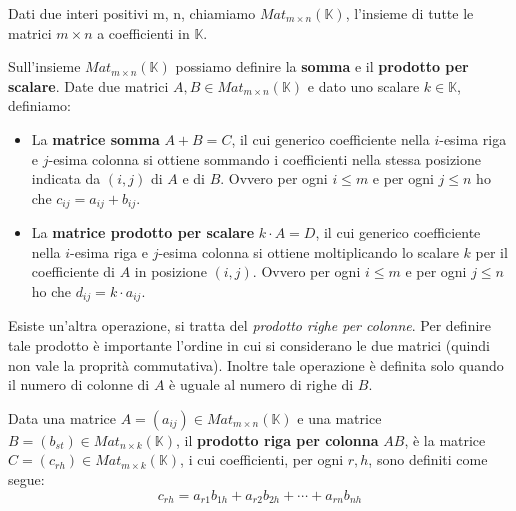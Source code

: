 \begin{definition}
	Dati due interi positivi m, n, chiamiamo
	$Mat_{m \times n} (\mathbb{K})$, l'insieme di tutte le matrici
	$m \times n$ a coefficienti in $\mathbb{K}$.
\end{definition}

\begin{definition}
	Sull'insieme $Mat_{m \times n} (\mathbb{K})$ possiamo definire la
	\textbf{somma} e il \textbf{prodotto per scalare}. Date due matrici
	$A, B \in Mat_{m \times n} (\mathbb{K})$ e dato uno scalare
	$k \in \mathbb{K}$, definiamo:
	\begin{itemize}
		\item
		      La \textbf{matrice somma} $A + B = C$, il cui generico coefficiente nella
		      $i$-esima riga e $j$-esima colonna si ottiene sommando i
		      coefficienti nella stessa posizione indicata da $(i, j)$ di $A$ e
		      di $B$. Ovvero per ogni $i \leq m$ e per ogni $j \leq n$
		      ho che $c_{ij} = a_{ij} + b_{ij}$.
		\item
		      La \textbf{matrice prodotto per scalare} $k \cdot A = D$, il cui
		      generico coefficiente nella $i$-esima riga e $j$-esima
		      colonna si ottiene moltiplicando lo scalare $k$ per il
		      coefficiente di $A$ in posizione $(i, j)$. Ovvero per ogni
		      $i \leq m$ e per ogni $j \leq n$ ho che
		      $d_{ij} = k \cdot a_{ij}$.
	\end{itemize}
\end{definition}

Esiste un'altra operazione, si tratta del
\emph{prodotto righe per colonne}. Per definire tale prodotto \`e
importante l'ordine in cui si considerano le due matrici (quindi non vale la
proprit\`a commutativa). Inoltre tale operazione \`e definita solo quando il
numero di colonne di $A$ \`e uguale al numero di righe di $B$.

\begin{definition}
	Data una matrice $A = (a_{ij}) \in Mat_{m \times n} (\mathbb{K})$ e una
	matrice $B = (b_{st}) \in Mat_{n \times k} (\mathbb{K})$, il
	\textbf{prodotto riga per colonna} $AB$, \`e la matrice
	$C = (c_{rh}) \in Mat_{m \times k} (\mathbb{K})$, i cui coefficienti,
	per ogni $r, h$, sono definiti come segue:
	\begin{equation*}
		c_{rh} = a_{r1} b_{1h} + a_{r2} b_{2h} + \cdots + a_{rn} b_{nh}
	\end{equation*}
\end{definition}

